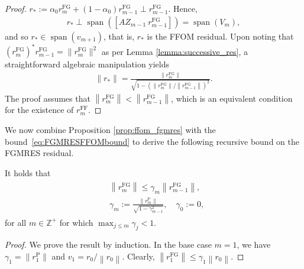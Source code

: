 \documentclass{siamart251216}
\DeclareMathOperator{\spn}{span}
\def\Z{\mathbb{Z}}
\begin{document}
{\begin{proof}
    $r_* := \alpha_0 r_{m}^{\mathrm{FG}} + (1-\alpha_0) r_{m-1}^{\mathrm{FG}} \perp r_{m-1}^{\mathrm{FG}}.$ Hence,
    \begin{align*}
        r_* \perp \spn ([A Z_{m-1} \ r_{m-1}^{\mathrm{FG}}]) = \spn (V_m),
    \end{align*}
    and so $r_* \in \spn (v_{m+1})$, that is, $r_*$ is the FFOM residual. Upon noting that $(r_m^{\mathrm{FG}})^* r_{m-1}^{\mathrm{FG}} = \|r_m^{\mathrm{FG}}\|^2$ as per Lemma \ref{lemma:successive_res}, a straightforward algebraic manipulation yields
    \begin{align*}
        \|r_*\| = \frac{\left\|r_m^{\mathrm{FG}}\right\|}{\sqrt{1-\left(\left\|r_m^{\mathrm{FG}}\right\| /\left\|r_{m-1}^{\mathrm{FG}}\right\|\right)^2}}.
    \end{align*}
    The proof assumes that $\left\|r_{m}^{\mathrm{FG}}\right\| < \left\|r_{m-1}^{\mathrm{FG}}\right\|$, which is an equivalent condition for the existence of $r_m^{\mathrm{FF}}$.
\end{proof}

We now combine Proposition \ref{prop:ffom_fgmres} with the bound~\eqref{eq:FGMRESFFOMbound} to derive the following recursive bound on the FGMRES residual.

\begin{proposition} \label{prop:recurrence_gamma}
    It holds that
    \begin{align}
        \begin{aligned} \label{eq:successive_rG_gamma}
             & \left\|r_m^{\mathrm{FG}}\right\| \leq \gamma_m \left\|r_{m-1}^{\mathrm{FG}}\right\|, \\
             & \gamma_m := \frac{\|r_m^{\mathrm{P}}\|}{\sqrt{1-\gamma_{m-1}^2}}, \quad \gamma_0 := 0,
        \end{aligned}
    \end{align}
    for all $m \in \Z^+$ for which $\max_{j \leq m} \gamma_{j}
        < 1$.
\end{proposition}


\begin{proof}
    We prove the result by induction. In the base case $m=1$, we have $\gamma_1 = \|r_1^{\mathrm{P}}\|$ and $v_1 = r_0 / \left\|r_0\right\|$. Clearly, $\left\|r_1^{\mathrm{FG}}\right\| \leq \gamma_1 \left\|r_0\right\|$.


\end{proof}}
\end{document}
